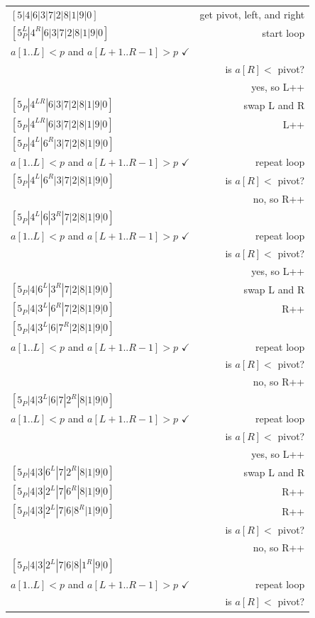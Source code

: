 \documentclass[twoside=false,DIV=14]{scrartcl}
\newcommand{\swaplr}{swap L and R}
\newcommand{\nrpp}{no, so R++}
\newcommand{\ylpp}{yes, so L++}
\newcommand{\isrp}{is $a[R] <$ pivot? }
\begin{document}
\newcommand{\invariant}{\color{blueish}$a[1..L] < p$ and $a[L+1..R-1] > p$ $\checkmark$}
{\tiny
\begin{tabular}{lr}
    $[5|4|6|3|7|2|8|1|9|0]$ & get pivot, left, and right \\
    $[5_P^L|4^R|6|3|7|2|8|1|9|0]$ & start loop \\
    \invariant & \\
                        & \isrp \\
                        & \ylpp \\
    $[5_P|4^{LR}|6|3|7|2|8|1|9|0]$   & \swaplr \\
    $[5_P|4^{LR}|6|3|7|2|8|1|9|0]$   & L++ \\
    $[5_P|4^L|6^R|3|7|2|8|1|9|0]$   &  \\
    \invariant & repeat loop \\
    $[5_P|4^L|6^R|3|7|2|8|1|9|0]$   & \isrp \\
                                    & \nrpp \\
    $[5_P|4^L|6|3^R|7|2|8|1|9|0]$   & \\
    \invariant & repeat loop \\
    & \isrp \\
    & \ylpp \\
    $[5_P|4|6^L|3^R|7|2|8|1|9|0]$   & \swaplr \\
    $[5_P|4|3^L|6^R|7|2|8|1|9|0]$   & R++ \\
    $[5_P|4|3^L|6|7^R|2|8|1|9|0]$   & \\
    \invariant & repeat loop \\
       & \isrp \\
       & \nrpp \\
    $[5_P|4|3^L|6|7|2^R|8|1|9|0]$   & \\
    \invariant & repeat loop \\
    & \isrp \\
    & \ylpp \\
    $[5_P|4|3|6^L|7|2^R|8|1|9|0]$   & \swaplr \\
    $[5_P|4|3|2^L|7|6^R|8|1|9|0]$   & R++ \\
    $[5_P|4|3|2^L|7|6|8^R|1|9|0]$   & R++ \\
    & \isrp \\
    & \nrpp \\
    $[5_P|4|3|2^L|7|6|8|1^R|9|0]$   & \\
    \invariant & repeat loop \\
    & \isrp \\

\end{tabular}}
\end{document}
